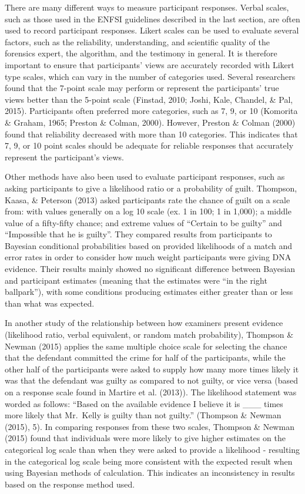\documentclass[print]{nuthesis}
\begin{document}
There are many different ways to measure participant responses.
Verbal scales, such as those used in the ENFSI guidelines described in the last section, are often used to record participant responses.
Likert scales can be used to evaluate several factors, such as the reliability, understanding, and scientific quality of the forensics expert, the algorithm, and the testimony in general.
It is therefore important to ensure that participants' views are accurately recorded with Likert type scales, which can vary in the number of categories used.
Several researchers found that the 7-point scale may perform or represent the participants' true views better than the 5-point scale (Finstad, 2010; Joshi, Kale, Chandel, \& Pal, 2015).
Participants often preferred more categories, such as 7, 9, or 10 (Komorita \& Graham, 1965; Preston \& Colman, 2000).
However, Preston \& Colman (2000) found that reliability decreased with more than 10 categories.
This indicates that 7, 9, or 10 point scales should be adequate for reliable responses that accurately represent the participant's views.

Other methods have also been used to evaluate participant responses, such as asking participants to give a likelihood ratio or a probability of guilt.
Thompson, Kaasa, \& Peterson (2013) asked participants rate the chance of guilt on a scale from: with values generally on a log 10 scale (ex. 1 in 100; 1 in 1,000); a middle value of a fifty-fifty chance; and extreme values of ``Certain to be guilty'' and ``Impossible that he is guilty''.
They compared results from participants to Bayesian conditional probabilities based on provided likelihoods of a match and error rates in order to consider how much weight participants were giving DNA evidence.
Their results mainly showed no significant difference between Bayesian and participant estimates (meaning that the estimates were ``in the right ballpark''), with some conditions producing estimates either greater than or less than what was expected.

In another study of the relationship between how examiners present evidence (likelihood ratio, verbal equivalent, or random match probability), Thompson \& Newman (2015) applies the same multiple choice scale for selecting the chance that the defendant committed the crime for half of the participants, while the other half of the participants were asked to supply how many more times likely it was that the defendant was guilty as compared to not guilty, or vice versa (based on a response scale found in Martire et al. (2013)).
The likelihood statement was worded as follows: ``Based on the available evidence I believe it is \_\_\_ times more likely that Mr.~Kelly is guilty than not guilty.'' (Thompson \& Newman (2015), 5).
In comparing responses from these two scales, Thompson \& Newman (2015) found that individuals were more likely to give higher estimates on the categorical log scale than when they were asked to provide a likelihood - resulting in the categorical log scale being more consistent with the expected result when using Bayesian methods of calculation.
This indicates an inconsistency in results based on the response method used.
\end{document}
